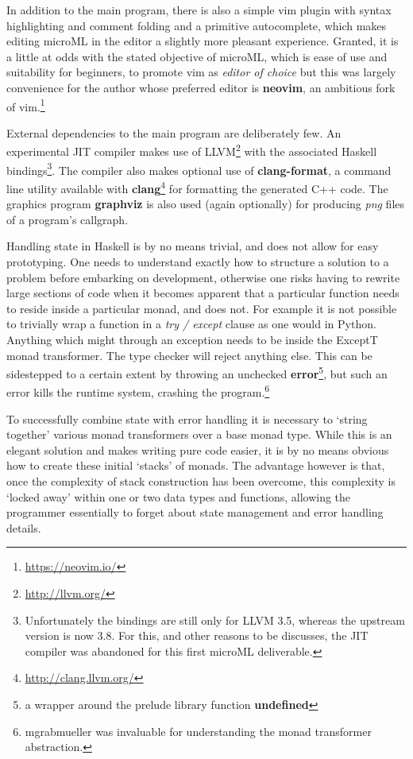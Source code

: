 \documentclass[12pt, a4paper]{report}
\begin{document}
In addition to the main program, there is also a simple vim plugin with syntax highlighting and
comment folding and a primitive autocomplete, which makes editing microML in the editor a slightly more pleasant experience.
Granted, it is a little at odds with the stated objective of microML, which is ease of use and
suitability for beginners, to promote vim as \textit{editor of choice} but this was largely
convenience for the author whose preferred editor is \textbf{neovim}, an ambitious fork of
vim.\footnote{\url{https://neovim.io/}} 

External dependencies to the main program are deliberately few. An experimental JIT compiler makes
use of LLVM\footnote{\url{http://llvm.org/}} with the associated Haskell
bindings\footnote{Unfortunately the bindings are still only for LLVM 3.5, whereas the upstream
version is now 3.8. For this, and other reasons to be discusses, the JIT compiler was abandoned for
this first microML deliverable.}. The compiler also makes optional use of \textbf{clang-format}, a
command line utility available with \textbf{clang}\footnote{\url{http://clang.llvm.org/}} for formatting 
the generated C++ code. The graphics program \textbf{graphviz} is also used (again optionally) for 
producing \textit{png} files of a program's callgraph. 

Handling state in Haskell is by no means trivial, and does not allow for easy prototyping. One needs
to understand exactly how to structure a solution to a problem before embarking on development,
otherwise one risks having to rewrite large sections of code when it becomes apparent that a
particular function needs to reside inside a particular monad, and does not. For example it is not
possible to trivially wrap a function in a \textit{try / except} clause as one would in Python.
Anything which might through an exception needs to be inside the ExceptT monad transformer. The type
checker will reject anything else. This can be sidestepped to a certain extent by throwing an
unchecked \textbf{error}\footnote{a wrapper around the prelude library function \textbf{undefined}},
but such an error kills the runtime system, crashing the program.\footnote{mgrabmueller was
invaluable for understanding the monad transformer abstraction.}

To successfully combine state with error handling it is necessary to `string together' various monad
transformers over a base monad type. While this is an elegant solution and makes writing pure code
easier, it is by no means obvious how to create these initial `stacks' of monads. The advantage
however is that, once the complexity of stack construction has been overcome, this complexity is
`locked away' within one or two data types and functions, allowing the programmer essentially to
forget about state management and error handling details. 
\end{document}
